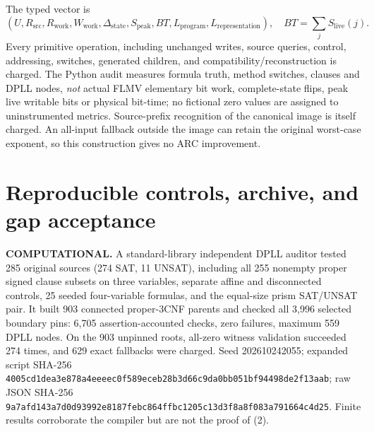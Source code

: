 \documentclass[11pt]{article}
\begin{document}
The typed vector is
\[
 (U,R_{\mathrm{src}},R_{\mathrm{work}},W_{\mathrm{work}},
 \Delta_{\mathrm{state}},S_{\mathrm{peak}},BT,
 L_{\mathrm{program}},L_{\mathrm{representation}}),
\quad BT=\sum_j S_{\mathrm{live}}(j).
\]
Every primitive operation, including unchanged writes, source
queries, control, addressing, switches, generated children, and
compatibility/reconstruction is charged. The Python audit measures
formula truth, method switches, clauses and DPLL nodes, \emph{not}
actual FLMV elementary bit work, complete-state flips, peak live
writable bits or physical bit-time; no fictional zero values are
assigned to uninstrumented metrics. Source-prefix recognition
of the canonical image is itself charged. An all-input fallback
outside the image can retain the original worst-case exponent,
so this construction gives no ARC improvement.

\section{Reproducible controls, archive, and gap acceptance}
\textbf{COMPUTATIONAL.} A standard-library independent DPLL auditor
tested 285 original sources (274 SAT, 11 UNSAT), including all 255
nonempty proper signed clause subsets on three variables, separate
affine and disconnected controls, 25 seeded four-variable formulas,
and the equal-size prism SAT/UNSAT pair. It built 903 connected
proper-3CNF parents and checked all 3,996 selected boundary pins:
6,705 assertion-accounted checks, zero failures, maximum 559
DPLL nodes. On the 903 unpinned roots, all-zero witness validation
succeeded 274 times, and 629 exact fallbacks were charged.
Seed 202610242055; expanded script SHA-256
\texttt{4005cd1dea3e878a4eeeec0f589eceb28b3d66c9da0bb051bf94498de2f13aab};
raw JSON SHA-256
\texttt{9a7afd143a7d0d93992e8187febc864ffbc1205c13d3f8a8f083a791664c4d25}.
Finite results corroborate the compiler but are not the proof of (2).
\end{document}
